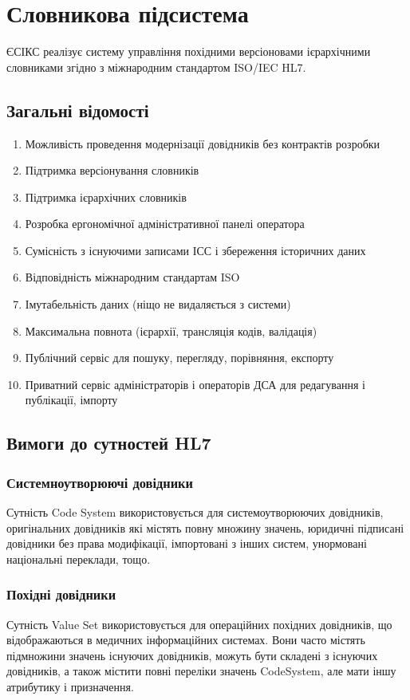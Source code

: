 \documentclass{article}
\begin{document}
\newpage
\section{Словникова підсистема}
ЄСІКС реалізує систему управління похідними версіоновами ієрархічними словниками згідно з міжнародним
стандартом ISO/IEC HL7.

\subsection{Загальні відомості}

\begin{enumerate}
\item Можливість проведення модернізації довідників без контрактів розробки
\item Підтримка версіонування словників
\item Підтримка ієрархічних словників
\item Розробка ергономічної адміністративної панелі оператора
\item Сумісність з існуючими записами ІСС і збереження історичних даних
\item Відповідність міжнародним стандартам ISO
\item Імутабельність даних (ніщо не видаляється з системи)
\item Максимальна повнота (ієрархії, трансляція кодів, валідація)
\item Публічний сервіс для пошуку, перегляду, порівняння, експорту
\item Приватний сервіс адміністраторів і операторів ДСА для редагування і публікації, імпорту
\end{enumerate}

\subsection{Вимоги до сутностей HL7}

\subsubsection{Системноутворюючі довідники}
Сутність Code System використовується для системоутворюючих довідників,
оригінальних довідників які містять повну множину значень, юридичні підписані
довідники без права модифікації, імпортовані з інших систем, унормовані національні переклади, тощо.

\subsubsection{Похідні довідники}
Сутність Value Set використовується для операційних похідних довідників,
що відображаються в медичних інформаційних системах. Вони часто містять
підмножини значень існуючих довідників, можуть бути складені з існуючих довідників,
а також містити повні переліки значень CodeSystem, але мати іншу атрибутику і призначення.
\end{document}
